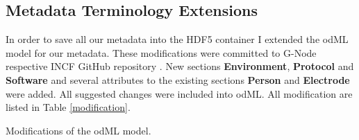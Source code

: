\documentclass[conference]{IEEEtran}
\begin{document}
 \subsection{Metadata Terminology Extensions}
 \label{meta_adjustments}
 In order to save all our metadata into the HDF5 container I extended the odML model for our metadata. These modifications were committed to G-Node respective INCF GitHub repository \cite{odmlgithub}. New sections \textbf{Environment}, \textbf{Protocol} and \textbf{Software} and several attributes to the existing sections \textbf{Person} and \textbf{Electrode} were added. All suggested changes were included into odML. All modification are listed in Table \ref{modification}.
 	\begin{savenotes}
 \begin{table}

 \caption{Modifications of the odML model.}
 	\label{modification}


\end{table}
\end{savenotes}
\end{document}
